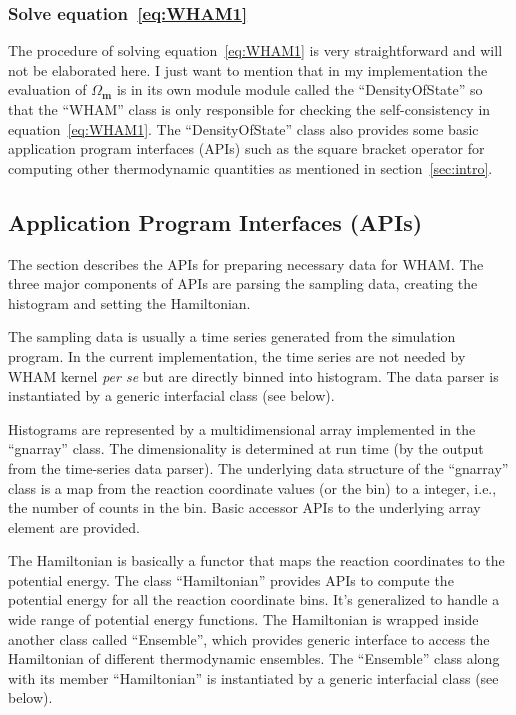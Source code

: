\subsubsection{Solve equation~\ref{eq:WHAM1}}
The procedure of solving equation~\ref{eq:WHAM1} is very straightforward and
will not be elaborated here. I just want to mention that in my implementation
the evaluation of $\Omega_{\mathbf{m}}$ is in its own module module called the
``DensityOfState'' so that the ``WHAM'' class is only responsible for checking
the self-consistency in equation~\ref{eq:WHAM1}.  The ``DensityOfState'' class
also provides some basic application program interfaces (APIs) such as the
square bracket operator for computing other thermodynamic quantities as
mentioned in section~\ref{sec:intro}.

\subsection{Application Program Interfaces (APIs)}\label{sec:api}
The section describes the APIs for preparing necessary data for WHAM. The three
major components of APIs are parsing the sampling data, creating the histogram 
and setting the Hamiltonian.

The sampling data is usually a time series generated from the simulation
program. In the current implementation, the time series are not needed by WHAM
kernel \textit{per se} but are directly binned into histogram. The data parser 
is instantiated by a generic interfacial class (see below). 

Histograms are represented by a multidimensional array implemented in the
``gnarray'' class. The dimensionality is determined at run time (by the output 
from the time-series data parser). The underlying data structure of the 
``gnarray'' class is a map from the reaction coordinate values (or the bin)
to a integer, i.e., the number of counts in the bin. Basic accessor APIs
to the underlying array element are provided.

The Hamiltonian is basically a functor that maps the reaction coordinates 
to the potential energy. The class ``Hamiltonian'' provides APIs to 
compute the potential energy for all the reaction coordinate bins. It's 
generalized to handle a wide range of potential energy functions. The 
Hamiltonian is wrapped inside another class called ``Ensemble'', 
which provides generic interface to access the Hamiltonian of different 
thermodynamic ensembles. The ``Ensemble'' class along with its member
``Hamiltonian'' is instantiated by a generic interfacial class (see below).


